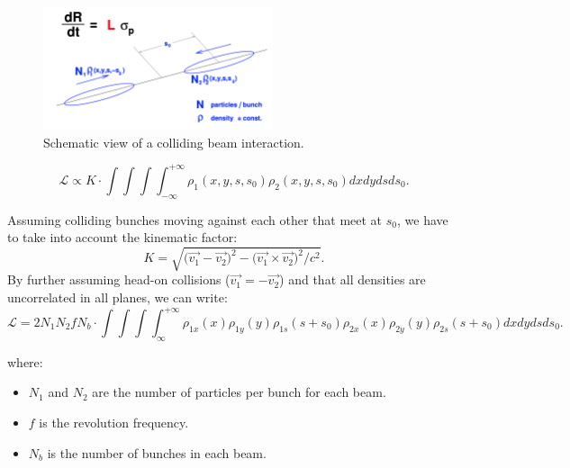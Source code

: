 \begin{figure}
    \centering
    \includegraphics[width=0.6\textwidth]{figures/luminosity_def.png}
    \caption{Schematic view of a colliding beam interaction.}
    \label{fig:lumi-def}
\end{figure}

\begin{equation}
    \mathcal{L} \propto K\cdot\int\int\int\int_{-\infty}^{+\infty}\rho_1(x,y,s,s_0)\rho_2(x,y,s,s_0)dxdydsds_0.\label{lumi_propto}
\end{equation}

Assuming colliding bunches moving against each other that meet at $s_0$, we have to take into account the kinematic factor\cite{Moller}:
\begin{equation}
    K = \sqrt{\bigl(\vec{v_1}-\vec{v_2}\bigr)^2-\bigl(\vec{v_1} \times \vec{v_2}\bigr)^2/c^2}.
\end{equation}
By further assuming head-on collisions ($\vec{v_1}=-\vec{v_2}$) and that all densities are uncorrelated in all planes, we can write:
\begin{equation}
        \mathcal{L} = 2 N_1 N_2 f N_b\cdot\int\int\int\int_{\infty}^{+\infty}\rho_{1x}(x)\rho_{1y}(y)\rho_{1s}(s+s_0)\rho_{2x}(x)\rho_{2y}(y)\rho_{2s}(s+s_0)dxdydsds_0.\label{beam_overlap}
\end{equation}

where:
\begin{itemize}
    \item \( N_1 \) and \( N_2 \) are the number of particles per bunch for each beam.
    \item \( f \) is the revolution frequency.
    \item \( N_b \) is the number of bunches in each beam.
\end{itemize}

